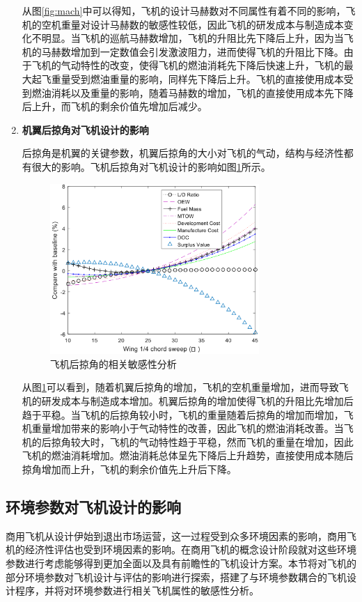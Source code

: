 \documentclass[12pt,a4paper]{report}
\begin{document}
\begin{enumerate}
从图\ref{fig:mach}中可以得知，飞机的设计马赫数对不同属性有着不同的影响，飞机的空机重量对设计马赫数的敏感性较低，因此飞机的研发成本与制造成本变化不明显。当飞机的巡航马赫数增加，飞机的升阻比先下降后上升，因为当飞机的马赫数增加到一定数值会引发激波阻力，进而使得飞机的升阻比下降。由于飞机的气动特性的改变，使得飞机的燃油消耗先下降后快速上升，飞机的最大起飞重量受到燃油重量的影响，同样先下降后上升。飞机的直接使用成本受到燃油消耗以及重量的影响，随着马赫数的增加，飞机的直接使用成本先下降后上升，而飞机的剩余价值先增加后减少。

\item \textbf{机翼后掠角对飞机设计的影响}

后掠角是机翼的关键参数，机翼后掠角的大小对飞机的气动，结构与经济性都有很大的影响。飞机后掠角对飞机设计的影响如图\ref{fig:sweep}所示。

\begin{figure}[htp]
  \centering
  \includegraphics[width=0.75\textwidth]{./media4/sweep.png}
  \caption{飞机后掠角的相关敏感性分析}
  \label{fig:sweep}
\end{figure}

从图\ref{fig:sweep}可以看到，随着机翼后掠角的增加，飞机的空机重量增加，进而导致飞机的研发成本与制造成本增加。机翼后掠角的增加使得飞机的升阻比先增加后趋于平稳。当飞机的后掠角较小时，飞机的重量随着后掠角的增加而增加，飞机重量增加带来的影响小于气动特性的改善，因此飞机的燃油消耗改善。当飞机的后掠角较大时，飞机的气动特性趋于平稳，然而飞机的重量在增加，因此飞机的燃油消耗增加。燃油消耗总体呈先下降后上升趋势，直接使用成本随后掠角增加而上升，飞机的剩余价值先上升后下降。
\end{enumerate}


\subsection{环境参数对飞机设计的影响}
商用飞机从设计伊始到退出市场运营，这一过程受到众多环境因素的影响，商用飞机的经济性评估也受到环境因素的影响。在商用飞机的概念设计阶段就对这些环境参数进行考虑能够得到更加全面以及具有前瞻性的飞机设计方案。本节将对飞机的部分环境参数对飞机设计与评估的影响进行探索，搭建了与环境参数耦合的飞机设计程序，并将对环境参数进行相关飞机属性的敏感性分析。
\end{document}
